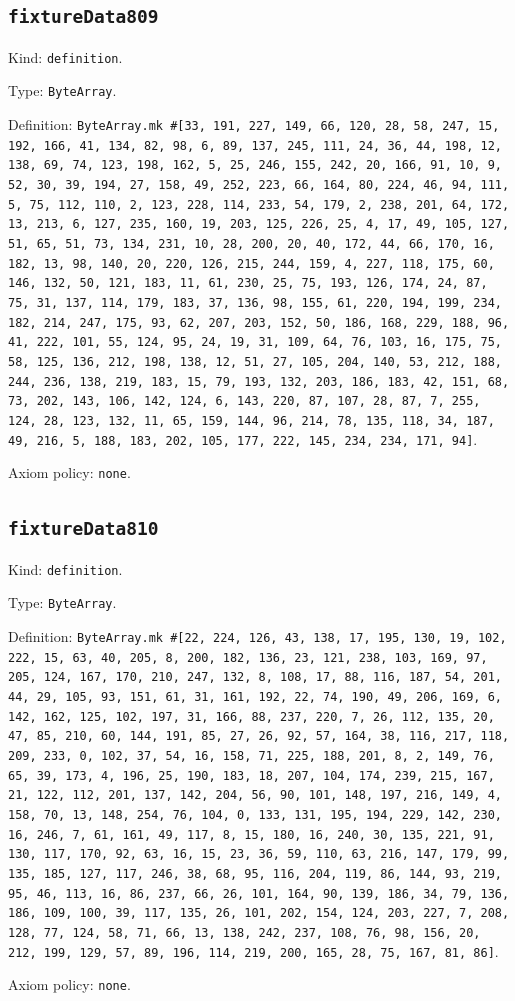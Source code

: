 \documentclass[11pt]{article}
\begin{document}
\subsection*{\texttt{fixtureData809}}
\noindent Kind: \texttt{definition}.\par
\noindent Type: \texttt{ByteArray}.\par
\noindent Definition: \texttt{ByteArray.mk \#[33, 191, 227, 149, 66, 120, 28, 58, 247, 15, 192, 166, 41, 134, 82, 98, 6, 89, 137, 245, 111, 24, 36, 44, 198, 12, 138, 69, 74, 123, 198, 162, 5, 25, 246, 155, 242, 20, 166, 91, 10, 9, 52, 30, 39, 194, 27, 158, 49, 252, 223, 66, 164, 80, 224, 46, 94, 111, 5, 75, 112, 110, 2, 123, 228, 114, 233, 54, 179, 2, 238, 201, 64, 172, 13, 213, 6, 127, 235, 160, 19, 203, 125, 226, 25, 4, 17, 49, 105, 127, 51, 65, 51, 73, 134, 231, 10, 28, 200, 20, 40, 172, 44, 66, 170, 16, 182, 13, 98, 140, 20, 220, 126, 215, 244, 159, 4, 227, 118, 175, 60, 146, 132, 50, 121, 183, 11, 61, 230, 25, 75, 193, 126, 174, 24, 87, 75, 31, 137, 114, 179, 183, 37, 136, 98, 155, 61, 220, 194, 199, 234, 182, 214, 247, 175, 93, 62, 207, 203, 152, 50, 186, 168, 229, 188, 96, 41, 222, 101, 55, 124, 95, 24, 19, 31, 109, 64, 76, 103, 16, 175, 75, 58, 125, 136, 212, 198, 138, 12, 51, 27, 105, 204, 140, 53, 212, 188, 244, 236, 138, 219, 183, 15, 79, 193, 132, 203, 186, 183, 42, 151, 68, 73, 202, 143, 106, 142, 124, 6, 143, 220, 87, 107, 28, 87, 7, 255, 124, 28, 123, 132, 11, 65, 159, 144, 96, 214, 78, 135, 118, 34, 187, 49, 216, 5, 188, 183, 202, 105, 177, 222, 145, 234, 234, 171, 94]}.\par
\noindent Axiom policy: \texttt{none}.\par
\subsection*{\texttt{fixtureData810}}
\noindent Kind: \texttt{definition}.\par
\noindent Type: \texttt{ByteArray}.\par
\noindent Definition: \texttt{ByteArray.mk \#[22, 224, 126, 43, 138, 17, 195, 130, 19, 102, 222, 15, 63, 40, 205, 8, 200, 182, 136, 23, 121, 238, 103, 169, 97, 205, 124, 167, 170, 210, 247, 132, 8, 108, 17, 88, 116, 187, 54, 201, 44, 29, 105, 93, 151, 61, 31, 161, 192, 22, 74, 190, 49, 206, 169, 6, 142, 162, 125, 102, 197, 31, 166, 88, 237, 220, 7, 26, 112, 135, 20, 47, 85, 210, 60, 144, 191, 85, 27, 26, 92, 57, 164, 38, 116, 217, 118, 209, 233, 0, 102, 37, 54, 16, 158, 71, 225, 188, 201, 8, 2, 149, 76, 65, 39, 173, 4, 196, 25, 190, 183, 18, 207, 104, 174, 239, 215, 167, 21, 122, 112, 201, 137, 142, 204, 56, 90, 101, 148, 197, 216, 149, 4, 158, 70, 13, 148, 254, 76, 104, 0, 133, 131, 195, 194, 229, 142, 230, 16, 246, 7, 61, 161, 49, 117, 8, 15, 180, 16, 240, 30, 135, 221, 91, 130, 117, 170, 92, 63, 16, 15, 23, 36, 59, 110, 63, 216, 147, 179, 99, 135, 185, 127, 117, 246, 38, 68, 95, 116, 204, 119, 86, 144, 93, 219, 95, 46, 113, 16, 86, 237, 66, 26, 101, 164, 90, 139, 186, 34, 79, 136, 186, 109, 100, 39, 117, 135, 26, 101, 202, 154, 124, 203, 227, 7, 208, 128, 77, 124, 58, 71, 66, 13, 138, 242, 237, 108, 76, 98, 156, 20, 212, 199, 129, 57, 89, 196, 114, 219, 200, 165, 28, 75, 167, 81, 86]}.\par
\noindent Axiom policy: \texttt{none}.\par
\end{document}
